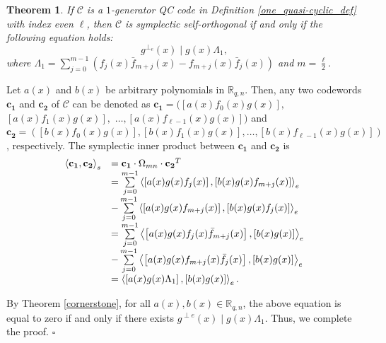 \documentclass[journal]{IEEEtran}
\newtheorem{theorem}{Theorem}
\newenvironment{proof}{{\noindent\it Proof:} }{\hfill $\square$\par}
\begin{document}
\begin{theorem}\label{one_quasi-cyclic}
	If $\mathscr{C}$ is a $1$-generator QC code in Definition \ref{one_quasi-cyclic_def} with index even $\ell$, then $\mathscr{C}$ is symplectic self-orthogonal if and only if the following equation holds:
	\begin{equation}
		g^{\perp_e}(x)\mid g(x)\Lambda_1,
	\end{equation}
where $\Lambda_1 =\sum\limits_{j = 0}^{m - 1}( {f_j}(x){{\bar f}_{m + j}}(x) - {f_{m + j}}(x){{\bar f}_j}(x) )$ and $m=\frac{\ell}{2}$.
\end{theorem}
\begin{proof}
	Let $a(x)$ and $b(x)$ be arbitrary polynomials in $\mathbb{R}_{q,n}$. Then, any two codewords $\mathbf{c_{1}}$ and $\mathbf{c_{2}}$ of $\mathscr{C}$ can be denoted as $\mathbf{c_{1}}=(\left[a(x) f_{0}(x) g(x)\right],$ $\left[a(x) f_{1}(x) g(x)\right],$ $\ldots, \left[a(x) f_{\ell-1}(x) g(x)\right])$ 
	and $\mathbf{c_{2}}=(\left[b(x) f_{0}(x) g(x)\right],\left[b(x) f_{1}(x) g(x)\right],\ldots, 
	\left[b(x)f_{\ell-1}(x)g(x)\right])$, respectively.
	The symplectic inner product between $\mathbf{c_{1}}$ and $\mathbf{c_{2}}$ is 
		\begin{equation} 
			\begin{array}{rl}
		\left\langle \mathbf{c_{1}}, \mathbf{c_{2}}\right\rangle_{s}&=\mathbf{c_{1}} \cdot \Omega _{mn} \cdot \mathbf{c_{2}}^{T} \\
		&= \sum\limits_{j = 0}^{m - 1} {{{\left\langle {\left[ {a(x)g(x){f_j}(x)} \right],\left[ {b(x)g(x){f_{m + j}}(x)} \right]} \right\rangle }_e}}  \\
		&- \sum\limits_{j = 0}^{m - 1} {{{\left\langle {\left[ {a(x)g(x){f_{m + j}}(x)} \right],\left[ {b(x)g(x){f_j}(x)} \right]} \right\rangle }_e}}  \hfill \\
		&= \sum\limits_{j = 0}^{m - 1} {{{\left\langle {\left[ {a(x)g(x){f_j}(x){{\bar f}_{m + j}}(x)} \right],\left[ {b(x)g(x)} \right]} \right\rangle }_e}}  \\
		&- \sum\limits_{j = 0}^{m - 1} {{{\left\langle {\left[ {a(x)g(x){f_{m + j}}(x){{\bar f}_j}(x)} \right],\left[ {b(x)g(x)} \right]} \right\rangle }_e}}  \hfill \\
		&= \left\langle \left[ a(x) g (x) \Lambda_1\right],\left[b(x)g(x)\right] \right\rangle_e.
	\end{array}	
\end{equation}


	By Theorem \ref{cornerstone}, for all $a(x),b(x)\in\mathbb{R}_{q,n}$, the above equation is equal to zero 
	 if and only if there exists
$g^{\perp e}(x) \mid g (x) \Lambda_1$. 
Thus, we complete the proof.
\end{proof}
\end{document}
